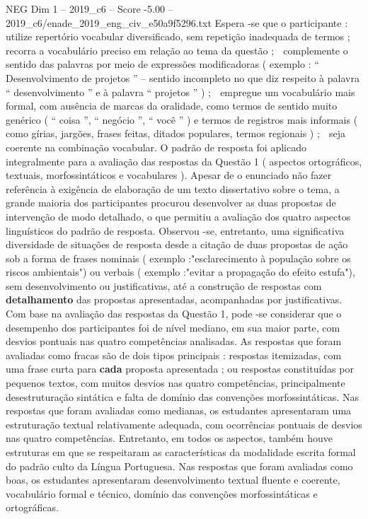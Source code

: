 \begin{textsample}{NEG Dim 1 – 2019\_c6 – Score -5.00 – 2019\_c6/enade\_2019\_eng\_civ\_e50a9f5296.txt}
Espera -se que o participante :  utilize repertório vocabular diversificado, sem repetição inadequada de termos ;  recorra a vocabulário preciso em relação ao tema da questão ;  complemente o sentido das palavras por meio de expressões modificadoras ( exemplo : “ Desenvolvimento de projetos ” – sentido incompleto no que diz respeito à palavra “ desenvolvimento ” e à palavra “ projetos ” ) ;  empregue um vocabulário mais formal, com ausência de marcas da oralidade, como termos de sentido muito genérico ( “ coisa ”, “ negócio ”, “ você ” ) e termos de registros mais informais ( como gírias, jargões, frases feitas, ditados populares, termos regionais ) ;  seja coerente na combinação vocabular.
O padrão de resposta foi aplicado integralmente para a avaliação das respostas da Questão 1 ( aspectos ortográficos, textuais, morfossintáticos e vocabulares ).
Apesar de o enunciado não fazer referência à exigência de elaboração de um texto dissertativo sobre o tema, a grande maioria dos participantes procurou desenvolver as duas propostas de intervenção de modo detalhado, o que permitiu a avaliação dos quatro aspectos linguísticos do padrão de resposta.
Observou -se, entretanto, uma significativa diversidade de situações de resposta desde a citação de duas propostas de ação sob a forma de frases nominais ( exemplo :"esclarecimento à população sobre os riscos ambientais") ou verbais ( exemplo :"evitar a propagação do efeito estufa"), sem desenvolvimento ou justificativas, até a construção de respostas com \textbf{detalhamento} das propostas apresentadas, acompanhadas por justificativas.
Com base na avaliação das respostas da Questão 1, pode -se considerar que o desempenho dos participantes foi de nível mediano, em sua maior parte, com desvios pontuais nas quatro competências analisadas.
As respostas que foram avaliadas como fracas são de dois tipos principais : respostas itemizadas, com uma frase curta para \textbf{cada} proposta apresentada ; ou respostas constituídas por pequenos textos, com muitos desvios nas quatro competências, principalmente desestruturação sintática e falta de domínio das convenções morfossintáticas.
Nas respostas que foram avaliadas como medianas, os estudantes apresentaram uma estruturação textual relativamente adequada, com ocorrências pontuais de desvios nas quatro competências.
Entretanto, em todos os aspectos, também houve estruturas em que se respeitaram as características da modalidade escrita formal do padrão culto da Língua Portuguesa.
Nas respostas que foram avaliadas como boas, os estudantes apresentaram desenvolvimento textual fluente e coerente, vocabulário formal e técnico, domínio das convenções morfossintáticas e ortográficas.

\end{textsample}
